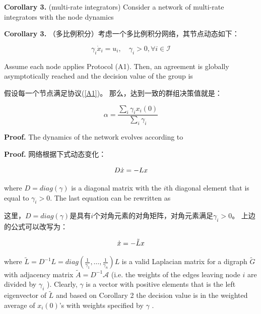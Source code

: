 \documentclass{article}
\begin{document}
{\color[gray]{0.5}
\noindent \textbf{Corollary 3.} (multi-rate integrators) Consider a network of multi-rate integrators with the node dynamics
}

\noindent \textbf{Corollary 3.} （多比例积分）考虑一个多比例积分网络，其节点动态如下：

\begin{equation}
    \gamma_i \dot{x}_i=u_i,\quad \gamma_i>0,\forall i \in \mathcal{I}
    \tag{20}
    \label{20}
\end{equation}

{\color[gray]{0.5}
\noindent Assume each node applies Protocol (A1). 
Then, an agreement is globally asymptotically reached and the decision value of the group is
}

\noindent 假设每一个节点满足协议(\ref{A1})。
那么，达到一致的群组决策值就是：

\begin{equation}
    \alpha = \frac{\sum_i \gamma_ix_i(0)}{\sum_i\gamma_i}
    \tag{21}
    \label{21}
\end{equation}

{\color[gray]{0.5}
\noindent \textbf{Proof.} The dynamics of the network evolves according to
}

\noindent \textbf{Proof.} 网络根据下式动态变化：

\begin{equation}
    D\dot{x} = -Lx
    \notag
\end{equation}

{\color[gray]{0.5}
\noindent where $D=diag(\gamma)$ is a diagonal matrix with the $i$th diagonal element that is equal to $\gamma_i>0$. 
The last equation can be rewritten as
}

\noindent 这里，$D=diag(\gamma)$是具有$i$个对角元素的对角矩阵，对角元素满足$\gamma_i>0$。
上边的公式可以改写为：

\begin{equation}
    \dot{x} = -\tilde{L}x
    \notag
\end{equation}

{\color[gray]{0.5}
\noindent where $\tilde{L} = D^{-1}L = diag(\frac{1}{\gamma_1},\dots,\frac{1}{\gamma_n})L$ is a valid Laplacian matrix for a digraph $\tilde{G}$ with adjacency matrix $\tilde{A}=D^{-1}\mathcal{A}$ (i.e. the weights of the edges leaving node $i$ are divided by $\gamma_i$ ). 
{\color{green}Clearly, $\gamma$ is a vector with positive elements that is the left eigenvector of $\tilde{L}$ and based on Corollary 2 the decision value is in the weighted average of $x_i(0)$’s with weights speciﬁed by $\gamma$} .
}
\end{document}
